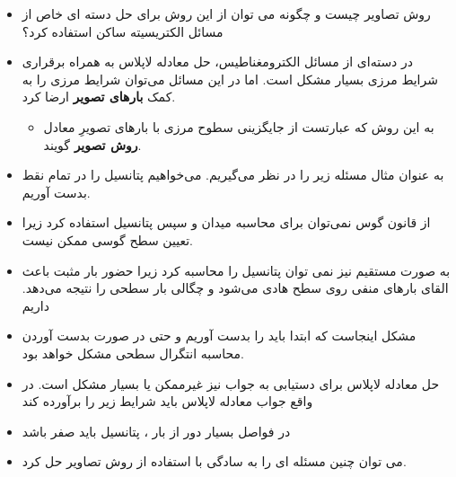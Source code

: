 \begin{ELunit}


\begin{itemize}
\item
  روش تصاویر چیست و چگونه می توان از این روش برای حل دسته ای خاص از مسائل الکتریسیته ساکن استفاده کرد؟
\item
  در دسته‌ای از مسائل الکترومغناطیس، حل معادله لاپلاس به همراه برقراری شرایط مرزی بسیار مشکل است. اما در این مسائل می‌توان شرایط مرزی را به کمک \textbf{بارهای تصویر} ارضا کرد.

  \begin{itemize}
  \tightlist
  \item
    به این روش که عبارتست از جایگزینی سطوح مرزی با بارهای تصویرِ معادل \textbf{روش تصویر} گویند.
  \end{itemize}
\item
  به عنوان مثال مسئله زیر را در نظر می‌گیریم. می‌خواهیم پتانسیل را در تمام نقط  بدست آوریم.
\end{itemize}


\begin{itemize}
\tightlist
\item
  از قانون گوس نمی‌توان برای محاسبه میدان و سپس پتانسیل استفاده کرد زیرا تعیین سطح گوسی ممکن نیست.
\item
  به صورت مستقیم نیز نمی توان پتانسیل را محاسبه کرد زیرا حضور بار مثبت  باعث القای بارهای منفی روی سطح هادی می‌شود و چگالی بار سطحی  را نتیجه می‌دهد. داریم
\end{itemize}


\begin{itemize}
\tightlist
\item
  مشکل اینجاست که ابتدا باید  را بدست آوریم و حتی در صورت بدست آوردن  محاسبه انتگرال سطحی مشکل خواهد بود.
\item
  حل معادله لاپلاس برای دستیابی به جواب نیز غیرممکن یا بسیار مشکل است. در واقع جواب معادله لاپلاس باید شرایط زیر را برآورده کند
\end{itemize}


\begin{itemize}
\tightlist
\item
  در فواصل بسیار دور از بار ، پتانسیل باید صفر باشد
\end{itemize}


\begin{itemize}
\tightlist
\item
  می توان چنین مسئله ای را به سادگی با استفاده از روش تصاویر حل کرد.
\end{itemize}

\end{ELunit}

